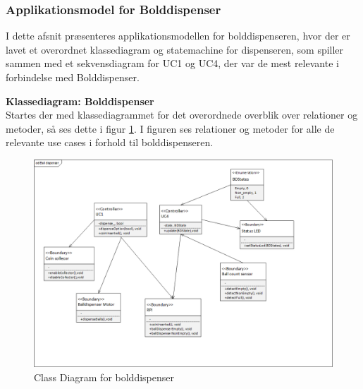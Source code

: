 \documentclass[Arkitektur/System_main.tex]{subfiles}
\begin{document}
\subsubsection{Applikationsmodel for Bolddispenser} \label{sec:balldispenser_application_model}
I dette afsnit præsenteres applikationsmodellen for bolddispenseren, hvor der er lavet et overordnet klassediagram og statemachine for dispenseren, som spiller sammen med et sekvensdiagram for UC1 og UC4, der var de mest relevante i forbindelse med Bolddispenser.

\textbf{Klassediagram: Bolddispenser}\\
Startes der med klassediagrammet for det overordnede overblik over relationer og metoder, så ses dette i figur \ref{fig:cd_balldispenser}. I figuren ses relationer og metoder for alle de relevante use cases i forhold til bolddispenseren.
\begin{figure}[H]
    \centering
    \includegraphics[width=\textwidth]{Arkitektur/Softwarearkitektur/Applikationsmodel/BallDispenser/graphicsBallDispenser/ApplikationsmodelBolddispensercd.png}
    \caption{Class Diagram for bolddispenser}
    \label{fig:cd_balldispenser}
\end{figure}
\newpage
\end{document}
